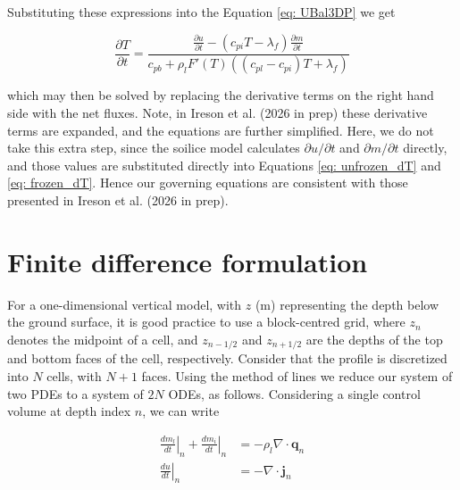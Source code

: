 \documentclass[10pt,a4paper]{article}
\begin{document}
Substituting these expressions into the Equation \ref{eq: UBal3DP} we get

%

\begin{equation} \label{eq: frozen_dT}
\frac{\partial T}{\partial t}
=
\frac{\displaystyle
\frac{\partial u}{\partial t}
-(c_{pi}T-\lambda_f)
\frac{\partial m}{\partial t}
}{c_{pb}
+\rho_l F'(T)
((c_{pl}-c_{pi})T+\lambda_f)
}
\end{equation}

which may then be solved by replacing the derivative terms on the right hand side with the net fluxes. Note, in Ireson et al. (2026 in prep) these derivative terms are expanded, and the equations are further simplified. Here, we do not take this extra step, since the soilice model calculates $\partial u/\partial t$ and $\partial m/\partial t$ directly, and those values are substituted directly into Equations \ref{eq: unfrozen_dT} and \ref{eq: frozen_dT}. Hence our governing equations are consistent with those presented in Ireson et al. (2026 in prep).

\section{Finite difference formulation}

For a one-dimensional vertical model, with $z$ (m) representing the depth below the ground surface, it is good practice to use a block-centred grid, where $z_n$ denotes the midpoint of a cell, and $z_{n-1/2}$ and $z_{n+1/2}$ are the depths of the top and bottom faces of the cell, respectively. Consider that the profile is discretized into $N$ cells, with $N+1$ faces. Using the method of lines we reduce our system of two PDEs to a system of $2N$ ODEs, as follows. Considering a single control volume at depth index $n$, we can write

\begin{equation} \label{eq: massAndEnergy}
	\begin{array}{rcl}
		\displaystyle
\left . \frac{dm_l}{dt}\right |_n
+ \left . \frac{dm_i}{dt}\right |_n
& 
\displaystyle 
= -\rho_l\nabla \cdot \mathbf{q}_n
\\[1.0em]
		\displaystyle
\left . \frac{du}{dt}\right |_n
& 
\displaystyle 
= -\nabla \cdot \mathbf{j}_n
	\end{array}
\end{equation}
\end{document}
